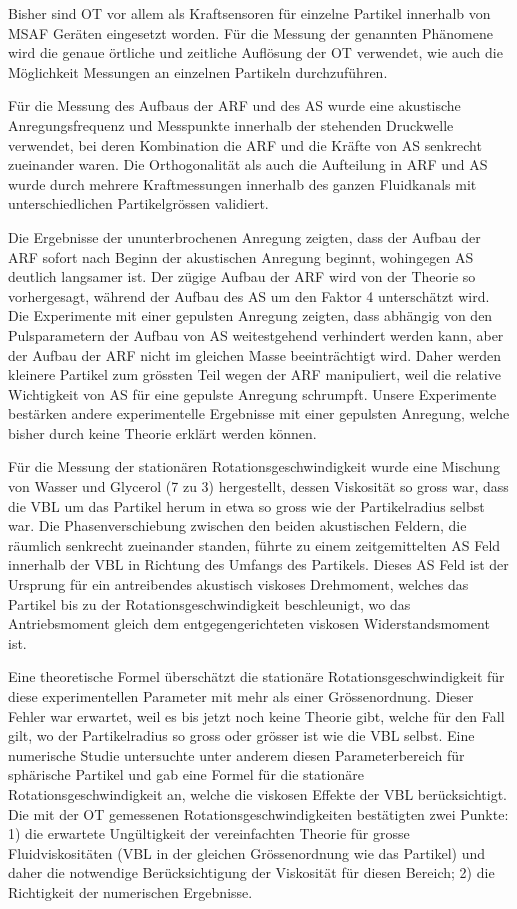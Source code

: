 Bisher sind OT vor allem als Kraftsensoren für einzelne Partikel innerhalb von 
MSAF Geräten eingesetzt worden. Für die Messung der genannten Phänomene wird 
die genaue örtliche und zeitliche Auflösung der OT verwendet, wie auch die 
Möglichkeit Messungen an einzelnen Partikeln durchzuführen.

Für die Messung des Aufbaus der ARF und des AS wurde eine akustische 
Anregungsfrequenz und Messpunkte innerhalb der stehenden Druckwelle verwendet, 
bei deren Kombination die ARF und die Kräfte von AS senkrecht zueinander waren.  
Die Orthogonalität als auch die Aufteilung in ARF und AS wurde durch mehrere 
Kraftmessungen innerhalb des ganzen Fluidkanals mit unterschiedlichen 
Partikelgrössen validiert.

Die Ergebnisse der ununterbrochenen Anregung zeigten, dass der Aufbau der ARF 
sofort nach Beginn der akustischen Anregung beginnt, wohingegen AS deutlich 
langsamer ist. Der zügige Aufbau der ARF wird von der Theorie so vorhergesagt, 
während der Aufbau des AS um den Faktor 4 unterschätzt wird. Die Experimente 
mit einer gepulsten Anregung zeigten, dass abhängig von den Pulsparametern der 
Aufbau von AS weitestgehend verhindert werden kann, aber der Aufbau der ARF 
nicht im gleichen Masse beeinträchtigt wird. Daher werden kleinere Partikel zum 
grössten Teil wegen der ARF manipuliert, weil die relative Wichtigkeit von AS 
für eine gepulste Anregung schrumpft. Unsere Experimente bestärken andere 
experimentelle Ergebnisse mit einer gepulsten Anregung, welche bisher durch 
keine Theorie erklärt werden können.

Für die Messung der stationären Rotationsgeschwindigkeit wurde eine Mischung 
von Wasser und Glycerol (7 zu 3) hergestellt, dessen Viskosität so gross war, 
dass die VBL um das Partikel herum in etwa so gross wie der Partikelradius 
selbst war. Die Phasenverschiebung zwischen den beiden akustischen Feldern, die 
räumlich senkrecht zueinander standen, führte zu einem zeitgemittelten AS Feld 
innerhalb der VBL in Richtung des Umfangs des Partikels. Dieses AS Feld ist der 
Ursprung für ein antreibendes akustisch viskoses Drehmoment, welches das 
Partikel bis zu der Rotationsgeschwindigkeit beschleunigt, wo das 
Antriebsmoment gleich dem entgegengerichteten viskosen Widerstandsmoment ist. 

Eine theoretische Formel überschätzt die stationäre Rotationsgeschwindigkeit 
für diese experimentellen Parameter mit mehr als einer Grössenordnung. Dieser 
Fehler war erwartet, weil es bis jetzt noch keine Theorie gibt, welche für den 
Fall gilt, wo der Partikelradius so gross oder grösser ist wie die VBL selbst.  
Eine numerische Studie untersuchte unter anderem diesen Parameterbereich für 
sphärische Partikel und gab eine Formel für die stationäre 
Rotationsgeschwindigkeit an, welche die viskosen Effekte der VBL 
berücksichtigt. Die mit der OT gemessenen Rotationsgeschwindigkeiten 
bestätigten zwei Punkte: 1) die erwartete Ungültigkeit der vereinfachten 
Theorie für grosse Fluidviskositäten (VBL in der gleichen Grössenordnung wie 
das Partikel) und daher die notwendige Berücksichtigung der Viskosität für 
diesen Bereich; 2) die Richtigkeit der numerischen Ergebnisse.

